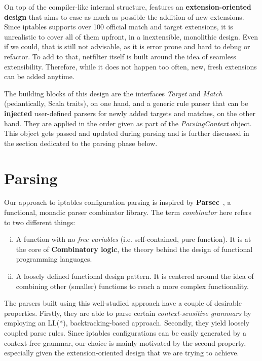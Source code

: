 On top of the compiler-like internal structure, \TOOL features an
\textbf{extension-oriented design} that aims to ease as much as possible the
addition of new extensions. Since iptables supports over 100 official match and
target extensions, it is unrealistic to cover all of them upfront, in a
inextensible, monolithic design.  Even if we could, that is still not
advisable, as it is error prone and hard to debug or refactor.  To add to that,
netfilter itself is built around the idea of seamless extensibility.
Therefore, while it does not happen too often, new, fresh extensions can be
added anytime.

The building blocks of this design are the interfaces \emph{Target} and
\emph{Match} (pedantically, Scala traits), on one hand, and a generic rule
parser that can be \textbf{injected} user-defined parsers for newly added
targets and matches, on the other hand.  They are applied in the order given as
part of the \emph{ParsingContext} object.  This object gets passed and updated
during parsing and is further discussed in the section dedicated to the parsing
phase below.


\section{Parsing}\label{sec:parsing}

Our approach to iptables configuration parsing is inspired by
\textbf{Parsec}~\cite{leijen2002parsec}, a functional, monadic parser
combinator library.  The term \emph{combinator} here refers to two different
things:
\begin{enumerate}[(i)]
  \item A function with no \emph{free variables} (i.e. self-contained, pure
    function).  It is at the core of \textbf{Combinatory logic}, the theory
    behind the design of functional programming languages.
  \item A loosely defined functional design pattern.  It is centered around the
    idea of combining other (smaller) functions to reach a more complex
    functionality.
\end{enumerate}

The parsers built using this well-studied approach have a couple of desirable
properties.  Firstly, they are able to parse certain \emph{context-sensitive
grammars} by employing an LL(*), backtracking-based approach.  Secondly, they
yield loosely coupled parse rules.  Since iptables configurations can be easily
generated by a context-free grammar, our choice is mainly motivated by the
second property, especially given the extension-oriented design that we are
trying to achieve.

